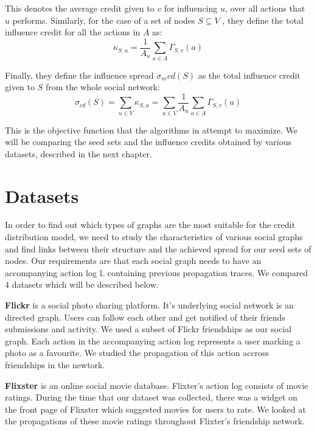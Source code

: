 \documentclass{acm_proc_article-sp}
\begin{document}
\noindent This denotes the average credit given to $v$ for influencing $u$, over all actions that $u$ performs. Similarly, for the case of a set of nodes $S \subseteq V$ , they define the total influence credit for all the actions in $A$ as:
\begin{equation}
		\kappa_{S,u} = \frac{1}{A_u} \displaystyle\sum_{a \in A} \Gamma_{S,v}(a)
\end{equation}

\noindent Finally, they define the influence spread $\sigma_m{cd}(S)$ as the total influence credit given to $S$ from the whole social network:
\begin{equation}
	\sigma_{cd}(S) = \displaystyle\sum_{u\in V} \kappa_{S,u} = \displaystyle\sum_{u\in V} \frac{1}{A_u} \displaystyle\sum_{a \in A} \Gamma_{S,v}(a)
\end{equation}

This is the objective function that the algorithms in \cite{goyal:datainfluence} attempt to maximize. We will be comparing the seed sets and the influence credits obtained by various datasets, described in the next chapter.



\section{Datasets}

In order to find out which types of graphs are the most suitable for the credit distribution model, we need to study the characteristics of various social graphs and find links between their structure and the achieved spread for our seed sets of nodes. Our requirements are that each social graph needs to have an accompanying action log $\mathbb{L}$ containing previous propagation traces. We compared 4 datasets which will be described below.

\textbf{Flickr} \cite{data:flickr} is a social photo sharing platform. It's underlying social network is an directed graph. Users can follow each other and get notified of their friends submissions and activity. We used a subset of Flickr friendships as our social graph. Each action in the accompanying action log represents a user marking a photo as a favourite. We studied the propagation of this action accross friendships in the newtork. \cite{data:flickr-paper}

\textbf{Flixster} \cite{data:flixster} is an online social movie database. Flixter's action log consists of movie ratings. During the time that our dataset was collected, there was a widget on the front page of Flixster which suggested movies for users to rate. We looked at the propagations of these movie ratings throughout Flixter's friendship network. \cite{data:flixsterpaper}
\end{document}
